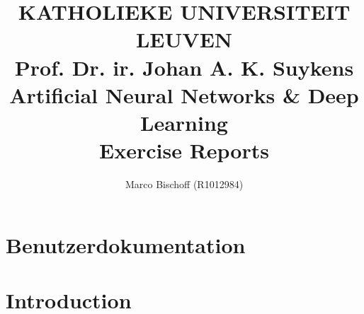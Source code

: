 \documentclass{article}
\title{
  \vspace*{2cm}
  {\bf \scriptsize
    KATHOLIEKE UNIVERSITEIT LEUVEN \\\vspace{0.3cm}
    Prof. Dr. ir. Johan A. K. Suykens
  } \vspace{2cm} \\
  Artificial Neural Networks \& Deep Learning \\
  {\large Exercise Reports}
}
\author{Marco Bischoff (R1012984)}
\begin{document}
\pagestyle{headings}

\maketitle
\newpage

\tableofcontents
\newpage







\cite{Ries1522Rad}

\newpage
\nocite{}





\appendix

\section{Benutzerdokumentation}
\label{app1}
\section{Introduction}
\end{document}
